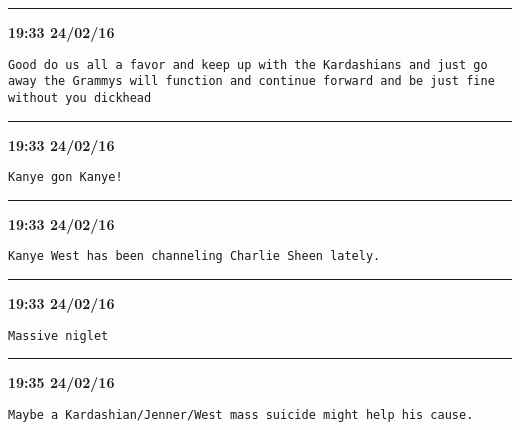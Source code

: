 \hrule%

\begin{adjustwidth}{0cm}{0cm}
\footnotesize \textbf{19:33 24/02/16}

\begin{lstlisting}[breaklines, breakatwhitespace, basicstyle=\small, frame=leftline]
Good do us all a favor and keep up with the Kardashians and just go away the Grammys will function and continue forward and be just fine without you dickhead
\end{lstlisting}
\end{adjustwidth}

\hrule%

\begin{adjustwidth}{0cm}{0cm}
\footnotesize \textbf{19:33 24/02/16}

\begin{lstlisting}[breaklines, breakatwhitespace, basicstyle=\small, frame=leftline]
Kanye gon Kanye!
\end{lstlisting}
\end{adjustwidth}

\hrule%

\begin{adjustwidth}{0cm}{0cm}
\footnotesize \textbf{19:33 24/02/16}

\begin{lstlisting}[breaklines, breakatwhitespace, basicstyle=\small, frame=leftline]
Kanye West has been channeling Charlie Sheen lately.
\end{lstlisting}
\end{adjustwidth}

\hrule%

\begin{adjustwidth}{0cm}{0cm}
\footnotesize \textbf{19:33 24/02/16}

\begin{lstlisting}[breaklines, breakatwhitespace, basicstyle=\small, frame=leftline]
Massive niglet
\end{lstlisting}
\end{adjustwidth}

\hrule%

\begin{adjustwidth}{0cm}{0cm}
\footnotesize \textbf{19:35 24/02/16}

\begin{lstlisting}[breaklines, breakatwhitespace, basicstyle=\small, frame=leftline]
Maybe a Kardashian/Jenner/West mass suicide might help his cause.
\end{lstlisting}
\end{adjustwidth}

